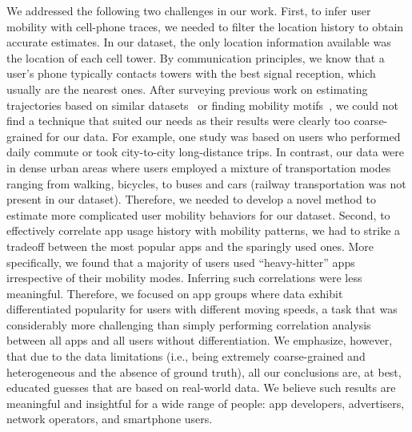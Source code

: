 We addressed the following two challenges in our work.
First, to infer user mobility with cell-phone traces,
we needed to filter the location history to obtain accurate estimates. In our dataset, the only location information available was the %
location of each cell tower. By communication principles, we know that a user's phone typically contacts towers with the best signal reception, which usually are the nearest ones. 
After surveying previous work on estimating trajectories based on similar datasets~\cite{smoreda2013spatiotemporal, hoteit2014estimating, widhalm2015discovering, Alsolami2012Auth, jiang2013review} or finding mobility motifs~\cite{wang2014mobile, gambs2012next}, we could not find a technique that suited our needs as their results were clearly too coarse-grained for our data. %
For example, one study was based on users who performed daily commute or took city-to-city long-distance trips. In contrast, our data were in dense urban areas where users employed a mixture of transportation modes ranging from walking, bicycles, to buses and cars (railway transportation was not present in our dataset). Therefore, we needed to develop a novel method to estimate more complicated user mobility behaviors for our dataset.
Second, to effectively correlate app usage history with mobility patterns, we had to strike a tradeoff between the most popular apps and the sparingly used ones. More specifically, we found that a majority of users used ``heavy-hitter'' apps irrespective of their mobility modes. Inferring such correlations were less meaningful. Therefore, we focused on app groups where data exhibit differentiated popularity for users with different moving speeds, a task that was considerably more challenging than simply performing correlation analysis between all apps and all users without differentiation. %
We emphasize, however, that due to the data limitations (i.e., being extremely coarse-grained and heterogeneous and the absence of ground truth),
all our conclusions are, at best, educated guesses that are based on real-world data. We believe such results are meaningful and insightful for a wide range of people: app developers, advertisers, network operators, and smartphone users.

